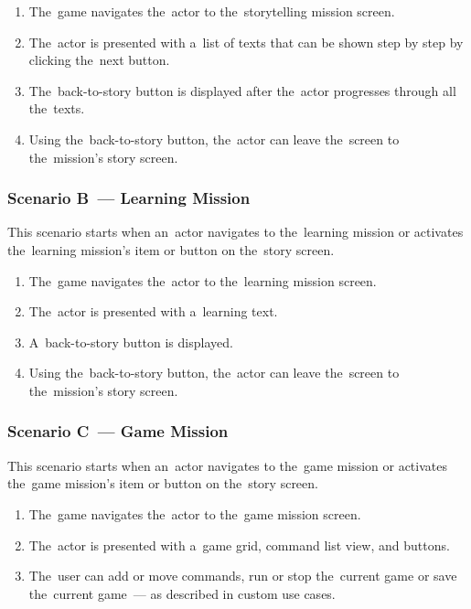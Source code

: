 \begin{enumerate}
    \item The~game navigates the~actor to the~storytelling mission screen.
    \item The~actor is presented with a~list of texts that can be shown step by step by clicking the~next button.
    \item The~back-to-story button is displayed after the~actor progresses through all the~texts.
    \item Using the~back-to-story button, the~actor can leave the~screen to the~mission's story screen.
\end{enumerate}

\subsubsection*{Scenario B~--- Learning Mission}

This scenario starts when an~actor navigates to the~learning mission or activates the~learning mission's item or button on the~story screen.

\begin{enumerate}
    \item The~game navigates the~actor to the~learning mission screen.
    \item The~actor is presented with a~learning text.
    \item A~back-to-story button is displayed.
    \item Using the~back-to-story button, the~actor can leave the~screen to the~mission's story screen.
\end{enumerate}

\subsubsection*{Scenario C~--- Game Mission}

This scenario starts when an~actor navigates to the~game mission or activates the~game mission's item or button on the~story screen.

\begin{enumerate}
    \item The~game navigates the~actor to the~game mission screen.
    \item The~actor is presented with a~game grid, command list view, and buttons.
    \item The~user can add or move commands, run or stop the~current game or save the~current game~--- as described in custom use cases.
\end{enumerate}

